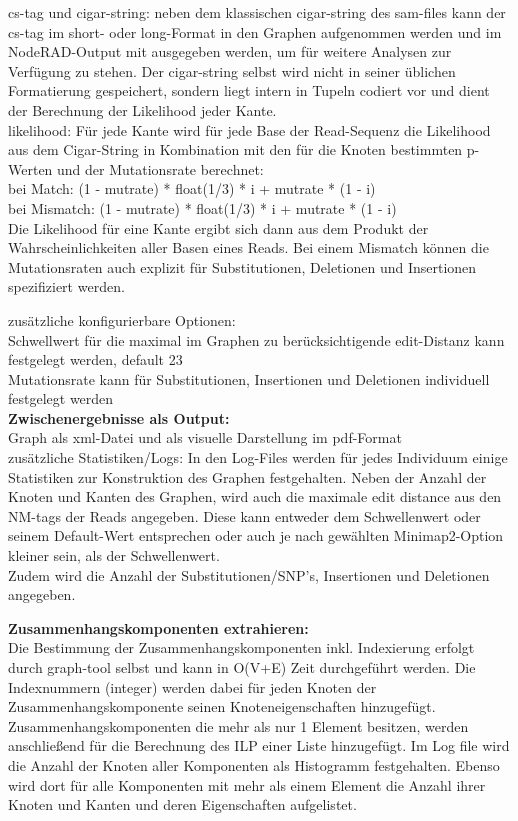     cs-tag und cigar-string: neben dem klassischen cigar-string des sam-files kann der cs-tag im short- oder long-Format in den Graphen aufgenommen werden und im NodeRAD-Output mit ausgegeben werden, um für weitere Analysen zur Verfügung zu stehen. Der cigar-string selbst wird nicht in seiner üblichen Formatierung gespeichert, sondern liegt intern in Tupeln codiert vor und dient der Berechnung der Likelihood jeder Kante.\\
    
    likelihood: Für jede Kante wird für jede Base der Read-Sequenz die Likelihood aus dem Cigar-String in Kombination mit den für die Knoten bestimmten p-Werten und der Mutationsrate berechnet:\\    
    bei Match: (1 - mutrate) * float(1/3) * i + mutrate * (1 - i)\\    
    bei Mismatch: (1 - mutrate) * float(1/3) * i + mutrate * (1 - i)\\    
    Die Likelihood für eine Kante ergibt sich dann aus dem Produkt der Wahrscheinlichkeiten aller Basen eines Reads. Bei einem Mismatch können die Mutationsraten auch explizit für Substitutionen, Deletionen und Insertionen spezifiziert werden.
    
zusätzliche konfigurierbare Optionen: \\
    Schwellwert für die maximal im Graphen zu berücksichtigende edit-Distanz kann festgelegt werden, default 23 \\
    Mutationsrate kann für Substitutionen, Insertionen und Deletionen individuell festgelegt werden \\
\textbf{Zwischenergebnisse als Output:} \\
    Graph als xml-Datei und als visuelle Darstellung im pdf-Format \\
    
zusätzliche Statistiken/Logs:
    In den Log-Files werden für jedes Individuum einige Statistiken zur Konstruktion des Graphen festgehalten. Neben der Anzahl der Knoten und Kanten des Graphen, wird auch die maximale edit distance aus den NM-tags der Reads angegeben. Diese kann entweder dem Schwellenwert oder seinem Default-Wert entsprechen oder auch je nach gewählten Minimap2-Option kleiner sein, als der Schwellenwert. \\
    Zudem wird die Anzahl der Substitutionen/SNP's, Insertionen und Deletionen angegeben.
    
\textbf{Zusammenhangskomponenten extrahieren:} \\
    Die Bestimmung der Zusammenhangskomponenten inkl. Indexierung erfolgt durch graph-tool selbst und kann in O(V+E) Zeit durchgeführt werden. Die Indexnummern (integer) werden dabei für jeden Knoten der Zusammenhangskomponente seinen Knoteneigenschaften hinzugefügt. Zusammenhangskomponenten die mehr als nur 1 Element besitzen, werden anschließend für die Berechnung des ILP einer Liste hinzugefügt. Im Log file wird die Anzahl der Knoten aller Komponenten als Histogramm festgehalten. Ebenso wird dort für alle Komponenten mit mehr als einem Element die Anzahl ihrer Knoten und Kanten und deren Eigenschaften aufgelistet.


